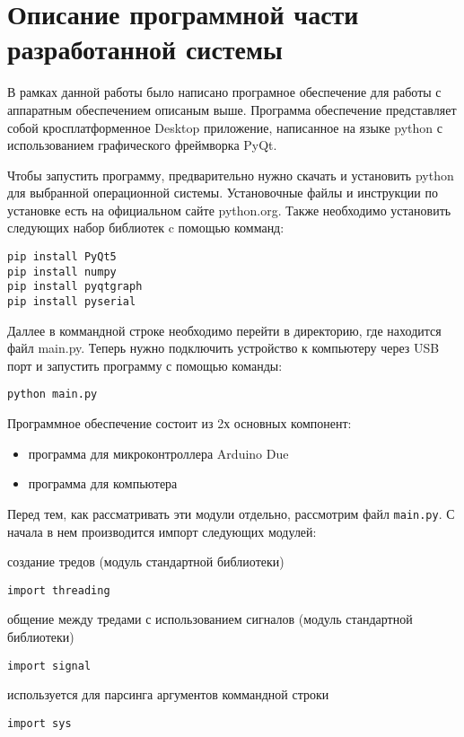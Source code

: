\documentclass[../main.tex]{subfiles}
\begin{document}
\section{Описание программной части разработанной системы}

В рамках данной работы было написано програмное обеспечение для работы с аппаратным обеспечением описаным выше. Программа обеспечение представляет собой кросплатформенное Desktop приложение, написанное на языке python с использованием графического фреймворка PyQt.

Чтобы запустить программу, предварительно нужно скачать и установить python для выбранной операционной системы. Установочные файлы и инструкции по установке есть на официальном сайте python.org. Также необходимо установить следующих набор библиотек c помощью комманд:

\begin{lstlisting}
pip install PyQt5
pip install numpy
pip install pyqtgraph
pip install pyserial
\end{lstlisting}

Даллее в коммандной строке необходимо перейти в директорию, где находится файл main.py. Теперь нужно подключить устройство к компьютеру через USB порт и запустить программу с помощью команды:

\begin{lstlisting}
python main.py
\end{lstlisting}


Программное обеспечение состоит из 2х основных компонент:
\begin{itemize}
    \item программа для микроконтроллера Arduino Due
    \item программа для компьютера
\end{itemize}

Перед тем, как рассматривать эти модули отдельно, рассмотрим файл \verb|main.py|. С начала в нем производится импорт следующих модулей:

создание тредов (модуль стандартной библиотеки)
\begin{lstlisting}
import threading       
\end{lstlisting}

общение между тредами с использованием сигналов (модуль стандартной библиотеки)
\begin{lstlisting}
import signal
\end{lstlisting}

используется для парсинга аргументов коммандной строки
\begin{lstlisting}
import sys
\end{lstlisting}
\end{document}
